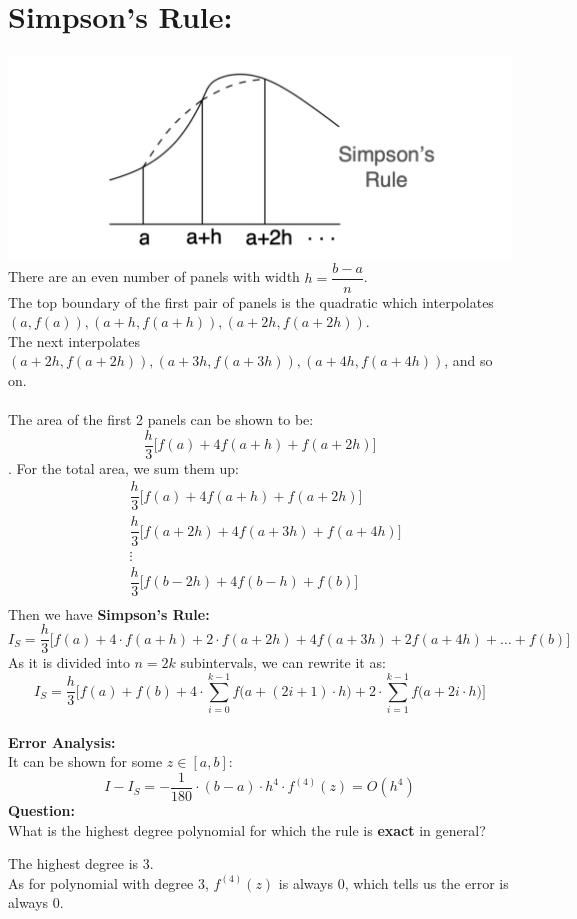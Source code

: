 \documentclass [9 pt]{article}
\theoremstyle{definition}
\begin{document}
\section*{Simpson's Rule:}
\includegraphics[scale = 0.5]{2}\\
There are an even number of panels with width $h=\dfrac{b-a}{n}$. \\
The top boundary of the first pair of panels is the quadratic which interpolates $(a, f(a)), (a+h, f(a+h)), (a+ 2h, f(a+ 2h))$. \\
The next interpolates $(a+ 2h, f(a+ 2h)),(a+ 3h, f(a+ 3h)), (a+ 4h, f(a+ 4h))$, and so on.\\
\\
The area of the first 2 panels can be shown to be:
$$ \dfrac{h}{3}\Big[ f(a) + 4f(a + h) + f(a + 2h) \Big] $$.
For the total area, we sum them up:
\begin{align*}
	&\dfrac{h}{3}\Big[ f(a) + 4f(a + h) + f(a + 2h) \Big] \\
	&\dfrac{h}{3}\Big[ f(a+2h) + 4f(a + 3h) + f(a + 4h) \Big] \\
	&\vdots\\
	&\dfrac{h}{3}\Big[ f(b- 2h) + 4f(b - h) + f(b) \Big] \\
\end{align*}
Then we have \textbf{Simpson's Rule:}
$$I_S  = \dfrac{h}{3} \Bigg[ f(a) + 4\cdot f(a + h) + 2 \cdot f(a + 2h) + 4f(a + 3h) + 2 f(a + 4h) + \ldots + f(b) \Bigg] $$
As it is divided into $n = 2k$ subintervals, we can rewrite it as:
$$ I_S  = \dfrac{h}{3} \Bigg[ f(a) + f(b) +  4\cdot \sum_{i = 0}^{k - 1} f\Big(a + (2i + 1) \cdot h\Big)  + 2\cdot \sum_{i = 1}^{k - 1} f\Big(a + 2i\cdot h\Big) \Bigg] $$
\\
\textbf{Error Analysis:}\\
It can be shown for some $z \in [a, b]$:
$$I - I_S = - \dfrac{1}{180} \cdot (b - a)\cdot h^4\cdot f^{(4)}(z) = O(h^4) $$
\textbf{Question:}\\
What is the highest degree polynomial for which the rule is \textbf{exact} in general?
\begin{mdframed}
	The highest degree is 3.\\
	As for polynomial with degree 3,  $f^{(4)}(z)$ is always 0, which tells us the error is always 0.
\end{mdframed}
\end{document}

